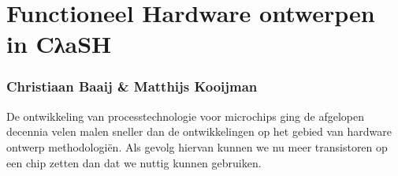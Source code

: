 \documentclass{paper}
\newcommand{\clash}{CλaSH}
\begin{document}
\pagestyle{empty}
\section*{Functioneel Hardware ontwerpen in \clash}
\subsubsection{Christiaan Baaij \& Matthijs Kooijman}

De ontwikkeling van processtechnologie voor microchips ging de afgelopen decennia velen malen sneller dan de ontwikkelingen op het gebied van hardware ontwerp methodologi\"{e}n. 
Als gevolg hiervan kunnen we nu meer transistoren op een chip zetten dan dat we nuttig kunnen gebruiken.
\end{document}
